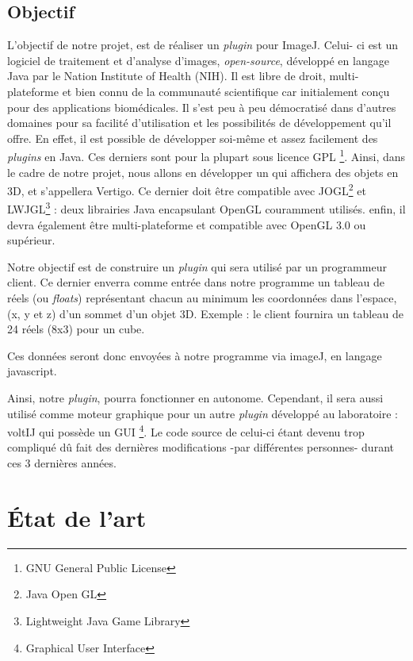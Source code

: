 \documentclass[11pt]{report}
\begin{document}
\section{Objectif}

 L'objectif de notre projet, est de réaliser un \textit{plugin} pour ImageJ. Celui- ci est un logiciel de traitement et d’analyse d’images, \textit{open-source}, développé en langage Java\cite{java} par le Nation Institute of Health (NIH). 
Il est libre de droit, multi-plateforme et bien connu de la communauté scientifique car initialement conçu pour des applications biomédicales. Il s’est peu à peu démocratisé dans d’autres domaines pour sa facilité d’utilisation et les possibilités de développement qu’il offre. 
En effet, il est possible de développer soi-même et assez facilement des \textit{plugins} en Java. Ces derniers sont pour la plupart sous licence GPL \footnote{GNU General Public License}.
 Ainsi, dans le cadre de notre projet, nous allons en développer un qui affichera des objets en 3D, et s'appellera Vertigo. Ce dernier doit être compatible avec JOGL\footnote{Java Open GL} \cite{jogl} et LWJGL\footnote{Lightweight Java Game Library} \cite{lwjgl} : deux librairies Java encapsulant OpenGL couramment utilisés.
enfin, il devra également être multi-plateforme et compatible avec OpenGL 3.0 ou supérieur.



Notre objectif est de construire un \textit{plugin} qui sera utilisé par un programmeur client. Ce dernier enverra comme entrée dans notre programme un tableau de réels (ou \textit{floats}) représentant chacun au minimum les coordonnées dans l'espace, (x, y et z) d'un sommet d'un objet 3D. Exemple : le client fournira un tableau de 24 réels (8x3) pour un cube.

 Ces données seront donc envoyées à notre programme via imageJ, en langage javascript\cite{javascript}.
 
Ainsi, notre \textit{plugin}, pourra fonctionner en autonome. Cependant, il sera aussi utilisé comme moteur graphique pour un autre \textit{plugin} développé au laboratoire : voltIJ qui possède un GUI \footnote{Graphical User Interface}.
Le code source de celui-ci étant devenu trop compliqué dû fait des dernières modifications -par différentes personnes- durant ces 3 dernières années.
\\



\chapter{État de l'art}
\end{document}
